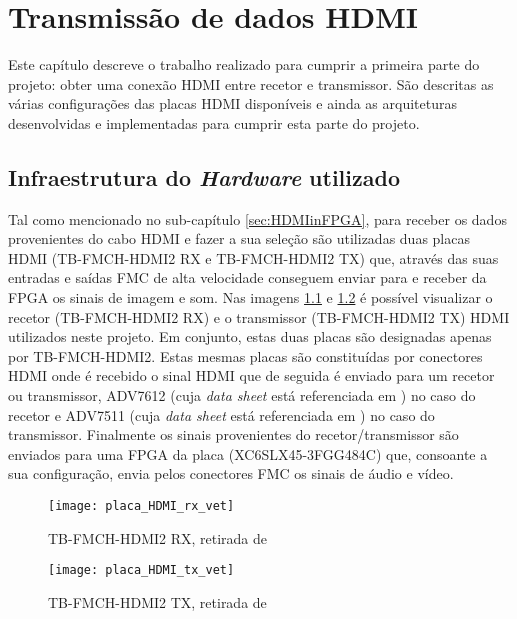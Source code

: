 \chapter{Transmissão de dados HDMI}\label{chap:chap3}

Este capítulo descreve o trabalho realizado para cumprir a primeira parte do projeto: obter uma conexão HDMI entre recetor e transmissor. São descritas as várias configurações das placas HDMI disponíveis e ainda as arquiteturas desenvolvidas e implementadas para cumprir esta parte do projeto. 

\section{Infraestrutura do \textit{Hardware} utilizado} \label{sec:hardware}

Tal como mencionado no sub-capítulo \ref{sec:HDMIinFPGA}, para receber os dados provenientes do cabo HDMI e fazer a sua seleção são utilizadas duas placas HDMI (TB-FMCH-HDMI2 RX e TB-FMCH-HDMI2 TX) que, através das suas entradas e saídas FMC de alta velocidade conseguem enviar para e receber da FPGA os sinais de imagem e som. Nas imagens \ref{fig:rx} e \ref{fig:tx} é possível visualizar o recetor (TB-FMCH-HDMI2 RX) e o transmissor (TB-FMCH-HDMI2 TX) HDMI utilizados neste projeto. Em conjunto, estas duas placas são designadas apenas por TB-FMCH-HDMI2. Estas mesmas placas são constituídas por conectores HDMI onde é recebido o sinal HDMI que de seguida é enviado para um recetor ou transmissor, ADV7612 (cuja \textit{data sheet} está referenciada em \cite{R038}) no caso do recetor e ADV7511 (cuja \textit{data sheet} está referenciada em \cite{R039}) no caso do transmissor. Finalmente os sinais provenientes do recetor/transmissor são enviados para uma FPGA da placa (XC6SLX45-3FGG484C) que, consoante a sua configuração, envia pelos conectores FMC os sinais de áudio e vídeo.

\begin{figure}[h!]
	\begin{center}
		\leavevmode
		\texttt{[image: placa\_HDMI\_rx\_vet]}
		\caption{TB-FMCH-HDMI2 RX, retirada de \cite{R009}}
		\label{fig:rx}
	\end{center}
\end{figure}

\begin{figure}[h!]
	\begin{center}
		\leavevmode
		\texttt{[image: placa\_HDMI\_tx\_vet]}
		\caption{TB-FMCH-HDMI2 TX, retirada de \cite{R009}}
		\label{fig:tx}
	\end{center}
\end{figure}



